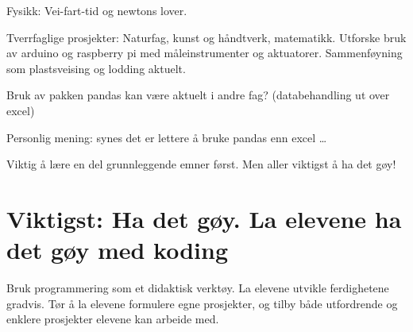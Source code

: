 \documentclass[11pt]{article}
\begin{document}
Fysikk: Vei-fart-tid og newtons lover.

Tverrfaglige prosjekter: Naturfag, kunst og håndtverk, matematikk.
Utforske bruk av arduino og raspberry pi med måleinstrumenter og
aktuatorer. Sammenføyning som plastsveising og lodding aktuelt.

Bruk av pakken pandas kan være aktuelt i andre fag? (databehandling ut
over excel)

Personlig mening: synes det er lettere å bruke pandas enn excel \ldots{}

Viktig å lære en del grunnleggende emner først. Men aller viktigst å ha
det gøy!

    \hypertarget{viktigst-ha-det-guxf8y.-la-elevene-ha-det-guxf8y-med-koding}{%
\section{Viktigst: Ha det gøy. La elevene ha det gøy med
koding}\label{viktigst-ha-det-guxf8y.-la-elevene-ha-det-guxf8y-med-koding}}

Bruk programmering som et didaktisk verktøy. La elevene utvikle
ferdighetene gradvis. Tør å la elevene formulere egne prosjekter, og
tilby både utfordrende og enklere prosjekter elevene kan arbeide med.


    
    
    
\end{document}
